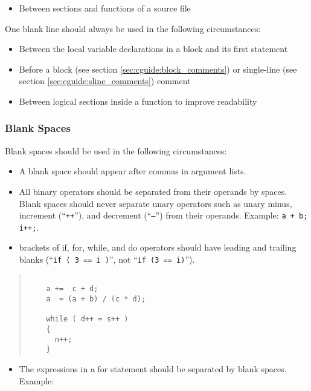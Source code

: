 \documentclass{article}
\newcommand{\T}{\texttt}
\begin{document}
\begin{itemize}
\item Between sections and functions of a source file  
\end{itemize}

One blank line should always be used in the following circumstances: 

\begin{itemize}
\item Between the local variable declarations in a block and its first statement  
\item Before a block (see section \ref{sec:cguide:block_comments}) or single-line
      (see section \ref{sec:cguide:sline_comments}) comment
\item Between logical sections inside a function to improve readability 
\end{itemize}
 
\subsubsection{Blank Spaces}

Blank spaces should be used in the following circumstances: 

\begin{itemize}
\item A blank space should appear after commas in argument lists.  
\item All binary operators should be separated from their
      operands by spaces. Blank spaces should never separate unary
      operators such as unary minus, increment (``\T{++}''), and decrement
      (``\T{--}'') from their operands. Example: \T{a + b; i++;}.
\item brackets of if, for, while, and do operators should have leading
      and trailing blanks (``\T{if ( 3 == i )}'', not ``\T{if (3 == i)}''). 

\end{itemize}
\begin{quote}
\begin{verbatim}

    a +=  c + d;
    a  = (a + b) / (c * d);
    
    while ( d++ = s++ ) 
    {
      n++;
    }
\end{verbatim}
\end{quote}


\begin{itemize}
\item The expressions in a for statement should be separated by blank spaces. Example: 
\end{itemize}
\end{document}
